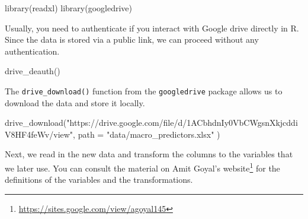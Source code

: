 \documentclass[
]{krantz}
\newenvironment{Shaded}{\begin{snugshade}}{\end{snugshade}}
\newcommand{\AttributeTok}[1]{\textcolor[rgb]{0.61,0.61,0.61}{#1}}
\newcommand{\FunctionTok}[1]{\textcolor[rgb]{0,0,0}{#1}}
\newcommand{\NormalTok}[1]{#1}
\newcommand{\StringTok}[1]{\textcolor[rgb]{0.5,0.5,0.5}{#1}}
\renewcommand{\href}[2]{#2\footnote{\url{#1}}}
\begin{document}
\begin{Shaded}
\begin{Highlighting}[]
\FunctionTok{library}\NormalTok{(readxl)}
\FunctionTok{library}\NormalTok{(googledrive)}
\end{Highlighting}
\end{Shaded}

Usually, you need to authenticate if you interact with Google drive directly in R. Since the data is stored via a public link, we can proceed without any authentication.

\begin{Shaded}
\begin{Highlighting}[]
\FunctionTok{drive\_deauth}\NormalTok{()}
\end{Highlighting}
\end{Shaded}

The \texttt{drive\_download()} function from the \texttt{googledrive} package allows us to download the data and store it locally.

\begin{Shaded}
\begin{Highlighting}[]
\FunctionTok{drive\_download}\NormalTok{(}\StringTok{"https://drive.google.com/file/d/1ACbhdnIy0VbCWgsnXkjcddiV8HF4feWv/view"}\NormalTok{,}
  \AttributeTok{path =} \StringTok{"data/macro\_predictors.xlsx"}
\NormalTok{)}
\end{Highlighting}
\end{Shaded}

Next, we read in the new data and transform the columns to the variables that we later use. You can consult the material on \href{https://sites.google.com/view/agoyal145}{Amit Goyal's website} for the definitions of the variables and the transformations.
\end{document}
